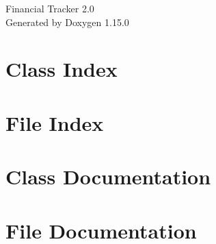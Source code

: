 \documentclass[twoside]{book}
\newcommand{\+}{\discretionary{\mbox{\scriptsize$\hookleftarrow$}}{}{}}
\newcommand{\clearemptydoublepage}{%
    \newpage{\pagestyle{empty}\cleardoublepage}%
  }
\begin{document}
  \raggedbottom
    \hypersetup{pageanchor=false,
                bookmarksnumbered=true,
                pdfencoding=unicode
               }
  \begin{titlepage}
  \vspace*{7cm}
  \begin{center}%
  {\Large Financial Tracker 2.\+0}\\
  \vspace*{1cm}
  {\large Generated by Doxygen 1.15.0}\\
  \end{center}
  \end{titlepage}
  \clearemptydoublepage
  \tableofcontents
  \clearemptydoublepage
  \hypersetup{pageanchor=true}

\chapter{Class Index}

\chapter{File Index}

\chapter{Class Documentation}







\chapter{File Documentation}


  \backmatter
  \newpage
  \clearemptydoublepage
  \printindex
\end{document}
